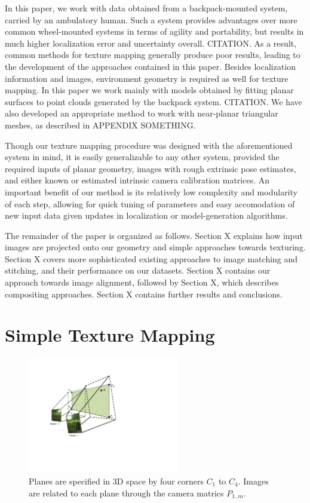 \documentclass[]{spie}  %
\begin{document}
In this paper, we work with data obtained from a backpack-mounted
system, carried by an ambulatory human. Such a system provides
advantages over more common wheel-mounted systems in terms of agility
and portability, but results in much higher localization error and
uncertainty overall. CITATION. As a result, common methods for texture
mapping generally produce poor results, leading to the development of
the approaches contained in this paper. Besides localization
information and images, environment geometry is required as well for
texture mapping. In this paper we work mainly with models obtained
by fitting planar surfaces to point clouds generated by the
backpack system. CITATION. We have also developed an appropriate
method to work with near-planar triangular meshes, as described in APPENDIX
SOMETHING.

Though our texture mapping procedure was designed with the
aforementioned system in mind, it is easily generalizable to any other
system, provided the required inputs of planar geometry, images with
rough extrinsic pose estimates, and either known or estimated
intrinsic camera calibration matrices. An important benefit of our method
is its relatively low complexity and modularity of each step,
allowing for quick tuning of parameters and easy accomodation of new
input data given updates in localization or model-generation
algorithms.

The remainder of the paper is organized as follows. Section X explains
how input images are projected onto our geometry and simple approaches
towards texturing. Section X covers more sophisticated existing
approaches to image matching and stitching, and their performance on
our datasets. Section X contains our approach towards image alignment,
followed by Section X, which describes compositing approaches. Section
X contains further results and conclusions.

\section{Simple Texture Mapping}
\label{sec:simpleTextureMapping}
\begin{figure}
  \centering
  \includegraphics[height=2in]{Projection.pdf}
  \caption{Planes are specified in 3D space by four corners $C_1$ to
    $C_4$. Images are related to each plane through the camera matrics
    $P_{1..m}$. }
  \label{fig:projection}
\end{figure}
\end{document}
